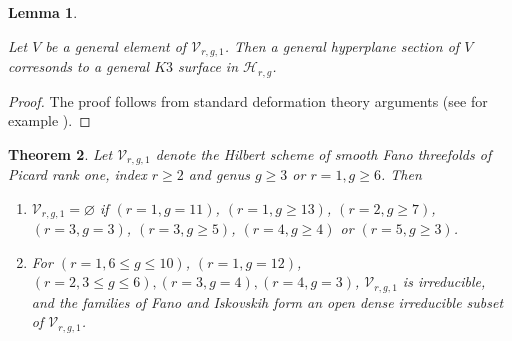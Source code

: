\documentclass[11pt,twoside]{amsart}
\theoremstyle{plain}
\numberwithin{equation}{section}
\newtheorem{theorem}{Theorem}[section]
\newtheorem{lemma}[theorem]{Lemma}
\theoremstyle{definition}
\begin{document}
\begin{lemma}\label{hyperplane section of a general fano is a general K3}

Let $V$ be a general element of $\mathcal{V}_{r,g,1}$. Then a general hyperplane section of $V$ corresonds to a general $K3$ surface in $\mathcal{H}_{r,g}$.
    
\end{lemma}

\begin{proof}
    The proof follows from standard deformation theory arguments (see for example \cite[Lemma $3.7$]{CLM98}).
\end{proof}

\begin{theorem}\label{classification of fanos with index two}
Let $\mathcal{V}_{r,g,1}$ denote the Hilbert scheme of smooth Fano threefolds of Picard rank one, index $r \geq 2$ and genus $g \geq 3$ or $r = 1, g \geq 6$. Then 
\begin{enumerate}
    \item $\mathcal{V}_{r,g,1} = \varnothing$ if $(r = 1, g = 11)$, $(r = 1, g \geq 13)$, $(r = 2, g \geq 7)$, $(r = 3, g = 3)$, $(r = 3, g \geq 5)$, $(r = 4, g \geq 4)$ or $(r = 5, g \geq 3)$. 
    \item For $(r = 1, 6 \leq g \leq 10)$, $(r = 1, g = 12)$, $(r = 2, 3 \leq g \leq 6), (r = 3, g = 4), (r = 4, g = 3)$, $\mathcal{V}_{r,g,1}$ is irreducible, and the families of Fano and Iskovskih form an open dense irreducible subset of $\mathcal{V}_{r,g,1}$.
\end{enumerate}
\end{theorem}
\end{document}
